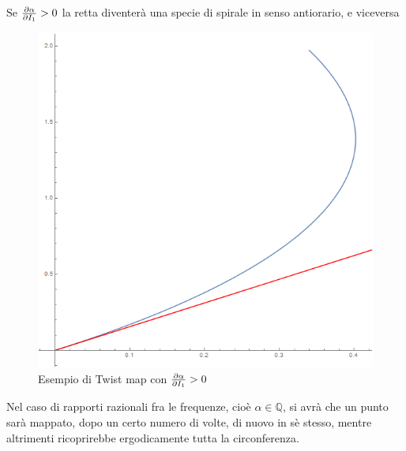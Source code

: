 \documentclass[a4paper,12pt]{article}
\theoremstyle{plain}
\theoremstyle{definition}
\theoremstyle{remark}
\begin{document}
Se $\pdv{\alpha}{I_1}>0$ la retta diventerà una specie di spirale in senso antiorario, e viceversa

\begin{figure}[h]
	\centering
	\includegraphics[scale=0.3]{twist}
\caption{Esempio di Twist map con $\pdv{\alpha}{I_1}>0$}
\label{twist}
\end{figure}
Nel caso di rapporti razionali fra le frequenze, cioè $\alpha\in\mathbb{Q}$, si avrà che un punto sarà mappato, dopo un certo numero di volte, di nuovo in sè stesso, mentre altrimenti ricoprirebbe ergodicamente tutta la circonferenza.\\
\end{document}
